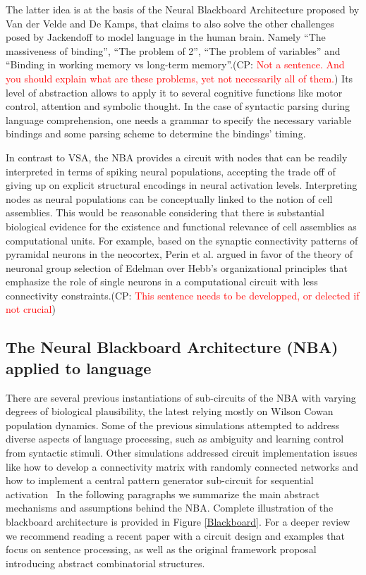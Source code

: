 \documentclass[10pt]{article}
\newcommand{\noteCP}[1]{(CP: \textcolor{red}{#1})}
\begin{document}
The latter idea is at the basis of the Neural Blackboard Architecture proposed by Van der Velde and De Kamps\cite{van_der_Velde_2006}, that claims to also solve the other challenges posed by Jackendoff to model language in the human brain.
Namely ``The massiveness of binding'', ``The problem of 2'', ``The problem of variables'' and ``Binding in working memory vs long-term memory''.\noteCP{Not a sentence. And you should explain what are these problems, yet not necessarily all of them.}
Its level of abstraction allows to apply it to several cognitive functions like motor control, attention and symbolic thought.
In the case of syntactic parsing during language comprehension, one needs a grammar to specify the necessary variable bindings and some parsing scheme to determine the bindings' timing.

In contrast to VSA, the NBA provides a circuit with nodes that can be readily interpreted in terms of spiking neural populations, accepting the trade off of giving up on explicit structural encodings in neural activation levels.
Interpreting nodes as neural populations can be conceptually linked to the notion of cell assemblies.
This would be reasonable considering that there is substantial biological evidence for the existence and functional relevance of cell assemblies as computational units\cite{Huyck_2013}.
For example, based on the synaptic connectivity patterns of pyramidal neurons in the neocortex, Perin et al.\cite{Perin_2011} argued in favor of the theory of neuronal group selection of Edelman\cite{edelman1987neural} over Hebb's organizational principles\cite{hebb2005organization} that emphasize the role of single neurons in a computational circuit with less connectivity constraints.\noteCP{This sentence needs to be developped, or delected if not crucial}


\subsection{The Neural Blackboard Architecture (NBA) applied to language}

{\label{935508}}

There are several previous instantiations of sub-circuits of the NBA with varying degrees of biological plausibility, the latest relying mostly on Wilson Cowan population dynamics\cite{Destexhe_2009}.
Some of the previous simulations attempted to address diverse aspects of language processing, such as ambiguity\cite{Frank_2014} and learning control from syntactic stimuli\cite{van_der_Velde_2010}.
Other simulations addressed circuit implementation issues like how to develop a connectivity matrix with randomly connected networks\cite{van_der_Velde_2011} and how to implement a central pattern generator sub-circuit for sequential activation~\cite{van_Dijk_2015}
In the following paragraphs we summarize the main abstract mechanisms and assumptions behind the NBA. Complete illustration of the blackboard architecture is provided in Figure {\ref{Blackboard}}.
For a deeper review we recommend reading a recent paper with a circuit design and examples that focus on sentence processing\cite{de2016combinatorial}, as well as the original framework proposal introducing abstract combinatorial structures\cite{van_der_Velde_2006}.
\end{document}
